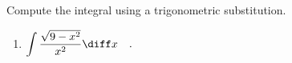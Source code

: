 Compute the integral using a trigonometric substitution.
\begin{enumerate}[ref={\fcProblemRef}]
\item \label{problemint(sqrt(9-x^2)/(x^2)dx)}
$ \displaystyle
\int \frac{\sqrt{9-x^2}}{x^2} \diff x\quad .
$

\end{enumerate}
